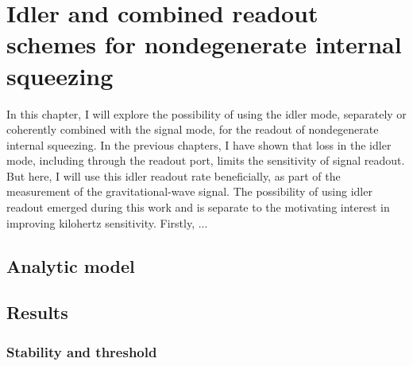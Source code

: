 \chapter{Idler and combined readout schemes for nondegenerate internal squeezing}
\label{chp:idler_readout}

In this chapter, I will explore the possibility of using the idler mode, separately or coherently combined with the signal mode, for the readout of nondegenerate internal squeezing. In the previous chapters, I have shown that loss in the idler mode, including through the readout port, limits the sensitivity of signal readout. But here, I will use this idler readout rate beneficially, as part of the measurement of the gravitational-wave signal. The possibility of using idler readout emerged during this work and is separate to the motivating interest in improving kilohertz sensitivity.
Firstly, ...








\section{Analytic model}



\section{Results}

\subsection{Stability and threshold}

